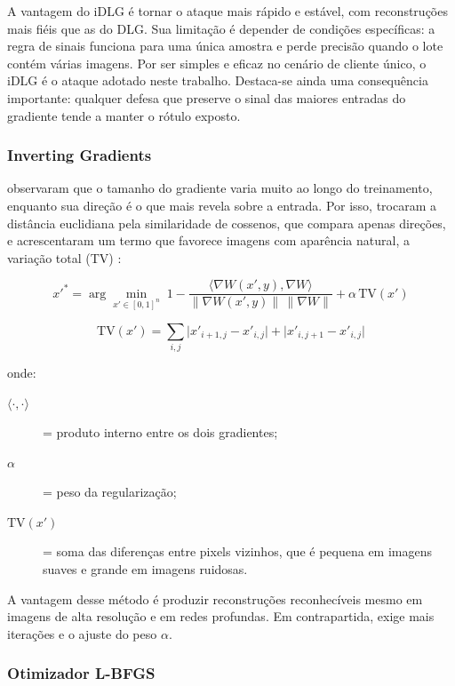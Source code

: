 A vantagem do iDLG é tornar o ataque mais rápido e estável, com reconstruções mais fiéis que as do DLG. Sua limitação é depender de condições específicas: a regra de sinais funciona para uma única amostra e perde precisão quando o lote contém várias imagens. Por ser simples e eficaz no cenário de cliente único, o iDLG é o ataque adotado neste trabalho. Destaca-se ainda uma consequência importante: qualquer defesa que preserve o sinal das maiores entradas do gradiente tende a manter o rótulo exposto.

\subsubsection{Inverting Gradients}

 observaram que o tamanho do gradiente varia muito ao longo do treinamento, enquanto sua direção é o que mais revela sobre a entrada. Por isso, trocaram a distância euclidiana pela similaridade de cossenos, que compara apenas direções, e acrescentaram um termo que favorece imagens com aparência natural, a variação total (TV) \cite{Rudin1992}:

\begin{equation} \label{eq:ig}
x'^{*} = \arg\min_{x' \in [0,1]^{n}} \; 1 - \frac{\langle \nabla W(x', y), \nabla W \rangle}{\| \nabla W(x', y) \| \, \| \nabla W \|} + \alpha \, \mathrm{TV}(x')
\end{equation}

\begin{equation} \label{eq:tv}
\mathrm{TV}(x') = \sum_{i,j} \big| x'_{i+1,j} - x'_{i,j} \big| + \big| x'_{i,j+1} - x'_{i,j} \big|
\end{equation}

\noindent onde:
\begin{description}
  \item[$\langle \cdot, \cdot \rangle$] = produto interno entre os dois gradientes;
  \item[$\alpha$] = peso da regularização;
  \item[$\mathrm{TV}(x')$] = soma das diferenças entre pixels vizinhos, que é pequena em imagens suaves e grande em imagens ruidosas.
\end{description}

A vantagem desse método é produzir reconstruções reconhecíveis mesmo em imagens de alta resolução e em redes profundas. Em contrapartida, exige mais iterações e o ajuste do peso $\alpha$.

\subsubsection{Otimizador L-BFGS}

